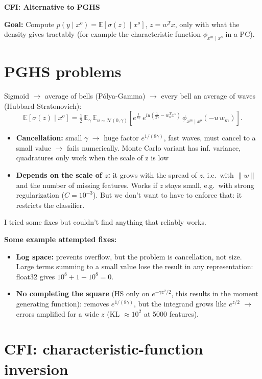\documentclass[10pt]{article}
\newcommand{\E}{\mathbb{E}}
\newcommand{\xo}{x^o}
\newcommand{\xm}{x^m}
\begin{document}
\begin{center}
  {\large\bfseries CFI: Alternative to PGHS}
\end{center}

\textbf{Goal:} Compute $p(y \mid \xo) = \E[\sigma(z) \mid \xo]$, $z = w^T x$, only with what the density gives tractably (for example the characteristic function $\phi_{\xm \mid \xo}$ in a PC).

\section*{PGHS problems}

Sigmoid $\to$ average of bells (Pólya-Gamma) $\to$ every bell an average of waves (Hubbard-Stratonovich):
\[
  \E[\sigma(z) \mid \xo] = \tfrac{1}{2}\, \E_{\gamma}\, \E_{u \sim \mathcal{N}(0, \gamma)} \left[ e^{\frac{1}{8\gamma}}\, e^{iu(\frac{1}{2\gamma} - w_o^T \xo)}\, \phi_{\xm \mid \xo}(-u\, w_m) \right].
\]
\begin{itemize}
  \item \textbf{Cancellation:} small $\gamma$ $\to$ huge factor $e^{1/(8\gamma)}$, fast waves, must cancel to a small value $\to$ fails numerically. Monte Carlo variant has inf. variance, quadratures only work when the scale of z is low
  \item \textbf{Depends on the scale of $z$:} it grows with the spread of $z$, i.e.\ with $\lVert w \rVert$ and the number of missing features. Works if $z$ stays small, e.g.\ with strong regularization ($C = 10^{-3}$). But we don't want to have to enforce that: it restricts the classifier.
\end{itemize}

I tried some fixes but couldn't find anything that reliably works.

\textbf{Some example attempted fixes:}
\begin{itemize}
  \item \textbf{Log space:} prevents overflow, but the problem is cancellation, not size. Large terms summing to a small value lose the result in any representation: float32 gives $10^8 + 1 - 10^8 = 0$.
  \item \textbf{No completing the square} (HS only on $e^{-\gamma z^2/2}$, this results in the moment generating function): removes $e^{1/(8\gamma)}$, but the integrand grows like $e^{z/2}$ $\to$ errors amplified for a wide $z$ (KL $\approx 10^2$ at 5000 features).
\end{itemize}

\section*{CFI: characteristic-function inversion}
\end{document}
